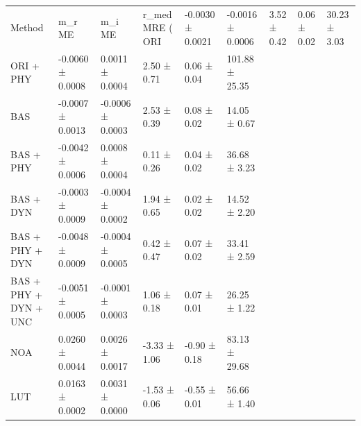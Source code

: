 \begin{tabular}{llllll}
\toprule
Method & m_r ME & m_i ME & r_med MRE (%
\midrule
ORI & -0.0030 ± 0.0021 & -0.0016 ± 0.0006 & 3.52 ± 0.42 & 0.06 ± 0.02 & 30.23 ± 3.03 \\
ORI + PHY & -0.0060 ± 0.0008 & 0.0011 ± 0.0004 & 2.50 ± 0.71 & 0.06 ± 0.04 & 101.88 ± 25.35 \\
BAS & -0.0007 ± 0.0013 & -0.0006 ± 0.0003 & 2.53 ± 0.39 & 0.08 ± 0.02 & 14.05 ± 0.67 \\
BAS + PHY & -0.0042 ± 0.0006 & 0.0008 ± 0.0004 & 0.11 ± 0.26 & 0.04 ± 0.02 & 36.68 ± 3.23 \\
BAS + DYN & -0.0003 ± 0.0009 & -0.0004 ± 0.0002 & 1.94 ± 0.65 & 0.02 ± 0.02 & 14.52 ± 2.20 \\
BAS + PHY + DYN & -0.0048 ± 0.0009 & -0.0004 ± 0.0005 & 0.42 ± 0.47 & 0.07 ± 0.02 & 33.41 ± 2.59 \\
BAS + PHY + DYN + UNC & -0.0051 ± 0.0005 & -0.0001 ± 0.0003 & 1.06 ± 0.18 & 0.07 ± 0.01 & 26.25 ± 1.22 \\
NOA & 0.0260 ± 0.0044 & 0.0026 ± 0.0017 & -3.33 ± 1.06 & -0.90 ± 0.18 & 83.13 ± 29.68 \\
LUT & 0.0163 ± 0.0002 & 0.0031 ± 0.0000 & -1.53 ± 0.06 & -0.55 ± 0.01 & 56.66 ± 1.40 \\
\bottomrule
\end{tabular}
